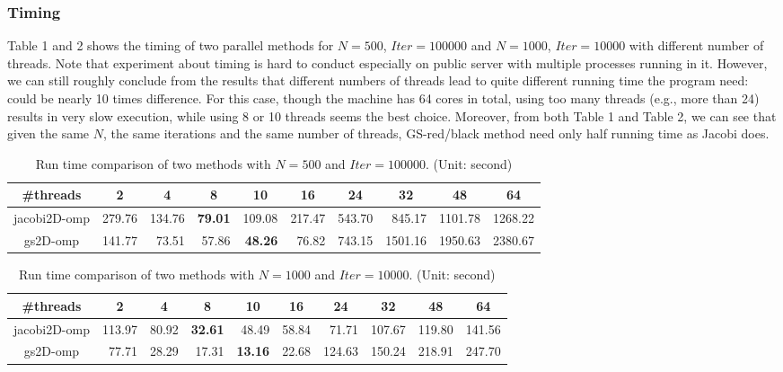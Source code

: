 \documentclass[11pt, oneside]{article}   	%
\begin{document}
\subsubsection{Timing}
Table 1 and 2 shows the timing of two parallel methods for $N=500$, $Iter= 100000$ and $N=1000$, $Iter= 10000$ with different number of threads. Note that experiment about timing is hard to conduct especially on public server with multiple processes running in it. However, we can still roughly conclude from the results that different numbers of threads lead to quite different running time the program need: could be nearly 10 times difference. For this case, though the machine has 64 cores in total, using too many threads (e.g., more than 24) results in very slow execution, while using 8 or 10 threads seems the best choice. Moreover, from both Table 1 and Table 2, we can see that given the same $N$, the same iterations and the same number of threads, GS-red/black method need only half running time as  Jacobi does. 
\begin{table}[ht]
\centering
\caption{Run time comparison of two methods with $N=500$ and $Iter= 100000$. (Unit: second)}
\begin{tabular}{|c|r|r|r|r|r|r|r|r|r|}
\hline
\#threads             & \multicolumn{1}{c|}{2} & \multicolumn{1}{c|}{4} & \multicolumn{1}{c|}{8} & \multicolumn{1}{c|}{10} & \multicolumn{1}{c|}{16} & \multicolumn{1}{c|}{24} & \multicolumn{1}{c|}{32} & \multicolumn{1}{c|}{48} & \multicolumn{1}{c|}{64} \\ \hline
jacobi2D-omp  & 279.76  & 134.76  & {\bf 79.01}  & 109.08   & 217.47   & 543.70   & 845.17   &  1101.78  & 1268.22   \\ \hline
gs2D-omp      &  141.77 & 73.51  & 57.86  &  {\bf 48.26} & 76.82   & 743.15   &  1501.16  &  1950.63  &  2380.67  \\ \hline
\end{tabular}
\end{table}
\begin{table}[ht]
\centering
\caption{Run time comparison of two methods with $N=1000$ and $Iter= 10000$. (Unit: second)}
\begin{tabular}{|c|r|r|r|r|r|r|r|r|r|}
\hline
\#threads             & \multicolumn{1}{c|}{2} & \multicolumn{1}{c|}{4} & \multicolumn{1}{c|}{8} & \multicolumn{1}{c|}{10} & \multicolumn{1}{c|}{16} & \multicolumn{1}{c|}{24} & \multicolumn{1}{c|}{32} & \multicolumn{1}{c|}{48} & \multicolumn{1}{c|}{64} \\ \hline
jacobi2D-omp  & 113.97  & 80.92  & {\bf 32.61}  & 48.49  &   58.84 &  71.71 &  107.67     &  119.80 & 141.56   \\ \hline
gs2D-omp      &  77.71 & 28.29  & 17.31 &  {\bf 13.16} & 22.68   & 124.63   &  150.24 &  218.91  &  247.70  \\ \hline
\end{tabular}
\end{table}
\end{document}

